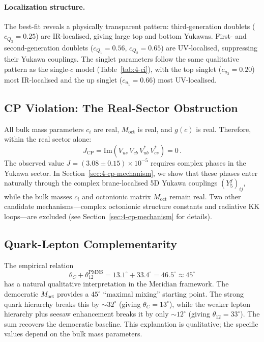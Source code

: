 \paragraph{Localization structure.} The best-fit reveals a physically transparent pattern: third-generation doublets ($c_{Q_3} = 0.25$) are IR-localised, giving large top and bottom Yukawas. First- and second-generation doublets ($c_{Q_1} = 0.56$, $c_{Q_2} = 0.65$) are UV-localised, suppressing their Yukawa couplings. The singlet parameters follow the same qualitative pattern as the single-$c$ model (Table~\ref{tab:4-ci}), with the top singlet ($c_{u_3} = 0.20$) most IR-localised and the up singlet ($c_{u_1} = 0.66$) most UV-localised.

\subsection{CP Violation: The Real-Sector Obstruction}
\label{sec:4-cp-real-sector}

All bulk mass parameters $c_i$ are real, $M_{\mathrm{oct}}$ is real, and $g(c)$ is real. Therefore, within the real sector alone:
\begin{equation}
  J_{\mathrm{CP}} = \mathrm{Im}(V_{us}\, V_{cb}\, V_{ub}^*\, V_{cs}^*) = 0\,.
  \label{eq:4-103}
\end{equation}
The observed value $J = (3.08 \pm 0.15) \times 10^{-5}$ requires complex phases in the Yukawa sector.  In Section~\ref{sec:4-cp-mechanism}, we show that these phases enter naturally through the complex brane-localised 5D Yukawa couplings $(Y_5^f)_{ij}$, while the bulk masses $c_i$ and octonionic matrix $M_{\mathrm{oct}}$ remain real.  Two other candidate mechanisms---complex octonionic structure constants and radiative KK loops---are excluded (see Section~\ref{sec:4-cp-mechanism} for details).

\subsection{Quark-Lepton Complementarity}
\label{sec:4-qlc}

The empirical relation
\begin{equation}
  \theta_C + \theta_{12}^{\mathrm{PMNS}} = 13.1^\circ + 33.4^\circ = 46.5^\circ \approx 45^\circ
  \label{eq:4-104}
\end{equation}
has a natural qualitative interpretation in the Meridian framework. The democratic $M_{\mathrm{oct}}$ provides a $45^\circ$ ``maximal mixing'' starting point. The strong quark hierarchy breaks this by $\sim 32^\circ$ (giving $\theta_C = 13^\circ$), while the weaker lepton hierarchy plus seesaw enhancement breaks it by only $\sim 12^\circ$ (giving $\theta_{12} = 33^\circ$). The sum recovers the democratic baseline. This explanation is qualitative; the specific values depend on the bulk mass parameters.


